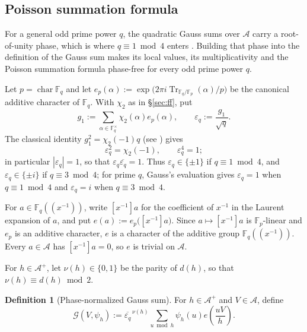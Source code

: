 \documentclass[a4paper,reqno]{amsart}
\numberwithin{equation}{section}
\theoremstyle{remark}
\theoremstyle{definition}
\newtheorem{definition}[theorem]{Definition}
\newcommand{\A}{\mathcal{A}}
\newcommand{\epsq}{\varepsilon_q}
\newcommand{\Gc}{\mathcal{G}}
\begin{document}
\subsection{Poisson summation formula}\label{sec:poisson}

For a general odd prime power $q$, the quadratic Gauss sums over $\A$ carry a
root-of-unity phase, which is where $q\equiv1\bmod4$ enters \cite{Fl17-1}.
Building that phase into the definition of the Gauss sum makes its local
values, its multiplicativity and the Poisson summation formula phase-free
for every odd prime power $q$.

Let $p=\operatorname{char}\mathbb F_q$ and let
$e_p(\alpha):=\exp\bigl(2\pi i\operatorname{Tr}_{\mathbb F_q/\mathbb F_p}(\alpha)/p\bigr)$
be the canonical additive character of $\mathbb F_q$. With $\chi_2$ as in
\S\ref{sec:ff}, put
\begin{equation}\label{eq:g1-def}
g_1:=\sum_{\alpha\in\mathbb F_q^\times}\chi_2(\alpha)e_p(\alpha),
\qquad
\epsq:=\frac{g_1}{\sqrt q}.
\end{equation}
The classical identity $g_1^2=\chi_2(-1)q$
(see \cite[Chapter~10, Section~3]{IR90}) gives
\begin{equation}\label{eq:epsq}
\epsq^2=\chi_2(-1), \qquad \epsq^4=1;
\end{equation}
in particular $|\epsq|=1$, so that $\epsq\overline{\epsq}=1$.
Thus $\epsq\in\{\pm1\}$ if $q\equiv1\bmod4$, and $\epsq\in\{\pm i\}$ if
$q\equiv3\bmod4$; for prime $q$, Gauss's evaluation gives $\epsq=1$ when
$q\equiv1\bmod4$ and $\epsq=i$ when $q\equiv3\bmod4$.

For $a\in\mathbb F_q((x^{-1}))$, write $[x^{-1}]a$ for the coefficient of
$x^{-1}$ in the Laurent expansion of $a$, and put
$e(a):=e_p\bigl([x^{-1}]a\bigr)$. Since $a\mapsto[x^{-1}]a$ is
$\mathbb F_p$-linear and $e_p$ is an additive character, $e$ is a character
of the additive group $\mathbb F_q((x^{-1}))$. Every $a\in\A$ has
$[x^{-1}]a=0$, so $e$ is trivial on $\A$.


For $h\in\A^+$, let $\nu(h)\in\{0,1\}$ be the parity of $d(h)$, so that
$\nu(h)\equiv d(h)\bmod2$.

\begin{definition}[Phase-normalized Gauss sum]
For $h\in\A^+$ and $V\in\A$, define
\begin{equation}\label{eq:Gc-def}
\Gc(V,\psi_h)
:=\overline{\epsq}^{\,\nu(h)}
\sum_{u\bmod h}\psi_h(u)e\!\left(\frac{uV}{h}\right).
\end{equation}
\end{definition}
\end{document}
